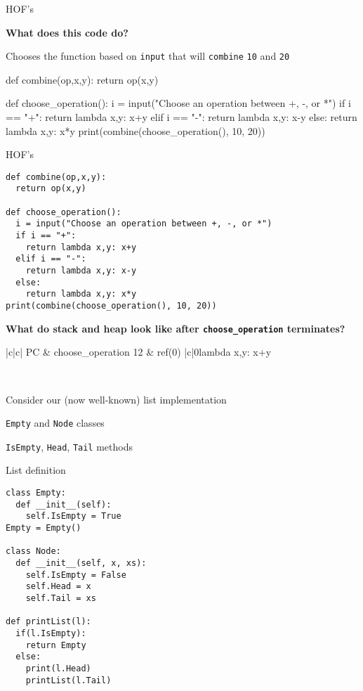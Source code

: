\documentclass{beamer}
\begin{document}
\begin{frame}[fragile]{HOF's}
\begin{codewithblock}{\item \textbf{What does this code do?} \pause \item Chooses the function based on \texttt{input} that will \texttt{combine} \texttt{10} and \texttt{20}}
def combine(op,x,y):
  return op(x,y)

def choose_operation():
  i = input("Choose an operation between +, -, or *")
  if i == "+":
    return lambda x,y: x+y
  elif i == "-":
    return lambda x,y: x-y
  else:
    return lambda x,y: x*y
print(combine(choose_operation(), 10, 20))
\end{codewithblock}
\end{frame}

\begin{frame}[fragile]{HOF's}
\begin{lstlisting}
def combine(op,x,y):
  return op(x,y)

def choose_operation():
  i = input("Choose an operation between +, -, or *")
  if i == "+":
    return lambda x,y: x+y
  elif i == "-":
    return lambda x,y: x-y
  else:
    return lambda x,y: x*y
print(combine(choose_operation(), 10, 20))
\end{lstlisting}

\textbf{What do stack and heap look like after \texttt{choose\_operation} terminates?}

\pause

\begin{memorytable}
{|c|c|}
{PC & choose\_operation}
{12 & ref(0)}
{|c|}{0}{lambda x,y: x+y}
\end{memorytable} \ \\
\end{frame}

\begin{slide}{
\item Consider our (now well-known) list implementation
\item \texttt{Empty} and \texttt{Node} classes
\item \texttt{IsEmpty}, \texttt{Head}, \texttt{Tail} methods
}\end{slide}

\begin{frame}[fragile]{List definition}
\begin{lstlisting}
class Empty:
  def __init__(self):
    self.IsEmpty = True
Empty = Empty()

class Node:
  def __init__(self, x, xs):
    self.IsEmpty = False
    self.Head = x
    self.Tail = xs

def printList(l):
  if(l.IsEmpty):
    return Empty
  else:
    print(l.Head)
    printList(l.Tail)
\end{lstlisting}
\end{frame}
\end{document}
